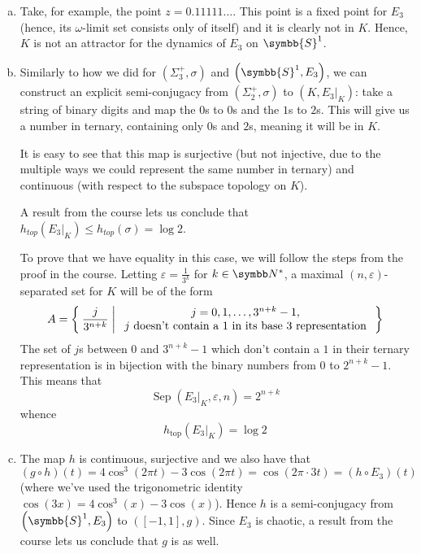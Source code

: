 \begin{problem}
\begin{enumerate}[a)]
    \item Take, for example, the point \(z = 0.11111\dots\). This point is a fixed point for \(E_3\) (hence, its \(\omega\)-limit set consists only of itself) and it is clearly not in \(K\). Hence, \(K\) is not an attractor for the dynamics of \(E_3\) on \(\symbb{S}^1\).

    \item Similarly to how we did for \(\left(\Sigma_3^+, \sigma\right)\) and \(\left(\symbb{S}^1, E_3\right)\), we can construct an explicit semi-conjugacy from \(\left(\Sigma_{2}^{+}, \sigma\right)\) to \(\left(K, \left.E_3\right|_{K}\right)\): take a string of binary digits and map the \(0\)s to \(0\)s and the \(1\)s to \(2\)s. This will give us a number in ternary, containing only \(0\)s and \(2\)s, meaning it will be in \(K\).
    
    It is easy to see that this map is surjective (but not injective, due to the multiple ways we could represent the same number in ternary) and continuous (with respect to the subspace topology on \(K\)).
    
    A result from the course lets us conclude that \(h_{top} \left(\left.E_3\right|_{K}\right) \leq h_{top} (\sigma) = \log 2\). 
    
    To prove that we have equality in this case, we will follow the steps from the proof in the course. Letting \(\varepsilon = \frac{1}{3^k}\) for \(k \in \naturals^*\), a maximal \((n, \varepsilon)\)-separated set for \(K\) will be of the form
    \[
        A = \Set{ \frac{j}{3^{n + k}} | \begin{array}{c}
                j = 0, 1, \dots, 3^{n + k} - 1, \\
                j \text{ doesn't contain a \(1\) in its base 3 representation}
            \end{array}
        }
    \]
    The set of \(j\)s between \(0\) and \(3^{n + k} - 1\) which don't contain a \(1\) in their ternary representation is in bijection with the binary numbers from \(0\) to \(2^{n + k} - 1\). This means that
    \[
        \operatorname{Sep} \left(\left.E_3\right|_{K}, \varepsilon, n\right) = 2^{n + k}
    \]
    whence
    \[
        h_{\operatorname{top}} \left(\left.E_3\right|_{K}\right) = \log 2
    \]

    \item The map \(h\) is continuous, surjective and we also have that
    \[
        (g \circ h) (t) = 4 \cos^3 (2 \pi t) - 3 \cos (2 \pi t) = \cos (2 \pi \cdot 3t) = (h \circ E_3) (t)
    \]
    (where we've used the trigonometric identity \(\cos (3x) = 4 \cos^3 (x) - 3 \cos (x)\)). Hence \(h\) is a semi-conjugacy from \(\left(\symbb{S}^1, E_3\right)\) to \(\left([-1, 1], g\right)\). Since \(E_3\) is chaotic, a result from the course lets us conclude that \(g\) is as well.
\end{enumerate}
\end{problem}

